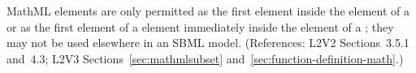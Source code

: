 MathML  elements are only permitted as the first element
inside the  element of a \FunctionDefinition or as the
first element of a  element immediately inside the
 element of a \FunctionDefinition; they may not be used
elsewhere in an SBML model.  (References: L2V2 Sections~3.5.1 and~4.3;
L2V3 Sections~\ref{sec:mathmlsubset}
and~\ref{sec:function-definition-math}.)

